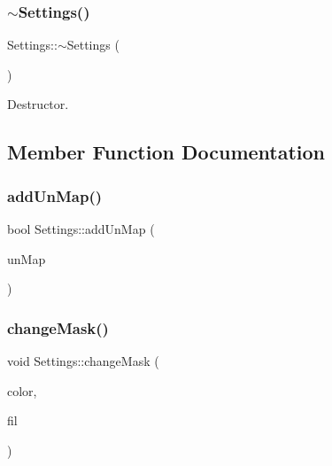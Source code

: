 \subsubsection{\texorpdfstring{$\sim$Settings()}{~Settings()}}
{\footnotesize\ttfamily Settings\+::$\sim$\+Settings (\begin{DoxyParamCaption}{ }\end{DoxyParamCaption})}



Destructor. 



\subsection{Member Function Documentation}
\mbox{\label{class_settings_aeee4537bd39c18ca3a711a73c9c2277e}} 
\subsubsection{\texorpdfstring{addUnMap()}{addUnMap()}}
{\footnotesize\ttfamily bool Settings\+::add\+Un\+Map (\begin{DoxyParamCaption}\item[{string}]{un\+Map }\end{DoxyParamCaption})}

\mbox{\label{class_settings_ad0d55c536a84990b048463b924c7d88e}} 
\subsubsection{\texorpdfstring{changeMask()}{changeMask()}\hspace{0.1cm}{\footnotesize\ttfamily [1/2]}}
{\footnotesize\ttfamily void Settings\+::change\+Mask (\begin{DoxyParamCaption}\item[{\mbox{\hyperlink{class_tuple}{Tuple}}$<$ \mbox{\hyperlink{class_settings_a30d85f2e06a54ae9bc8da2d01037658f}{C\+O\+L\+OR}} $>$}]{color,  }\item[{\mbox{\hyperlink{class_tuple}{Tuple}}$<$ \mbox{\hyperlink{class_filter}{Filter}} $>$}]{fil }\end{DoxyParamCaption})}



